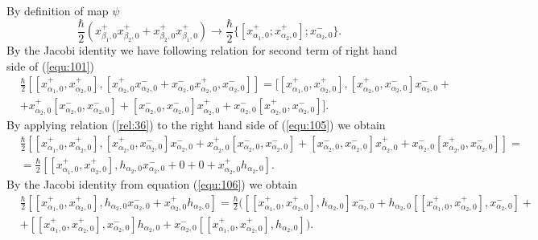 \documentclass[english]{elsarticle}
\numberwithin{equation}{section}
\begin{document}
By definition of map $\psi$
\begin{equation}
\label{midres:3}
\frac{\hbar}{2}\left(x_{\beta_{1},0}^{+}x_{\beta_{2},0}^{+}+x_{\beta_{2},0}^{+}x_{\beta_{1},0}^{+}\right) \rightarrow \frac{\hbar}{2}\{[x_{\alpha_{1},0}^{+};x_{\alpha_{2},0}^{+}];x_{\alpha_{2},0}^{-}\}.
\end{equation}
By the Jacobi identity we have following relation for second term of right hand side of (\ref{equ:101})
\begin{equation}
\label{equ:105}
\begin{split}
&\frac{\hbar}{2}[[x_{\alpha_{1},0}^{+},x_{\alpha_{2},0}^{+}],[x_{\alpha_{2},0}^{+}x_{\alpha_{2},0}^{-}+ x_{\alpha_{2},0}^{-}x_{\alpha_{2},0}^{+},x_{\alpha_{2},0}^{-}]]= [[x_{\alpha_{1},0}^{+},x_{\alpha_{2},0}^{+}],[x_{\alpha_{2},0}^{+},x_{\alpha_{2},0}^{-}]x_{\alpha_{2},0}^{-}+\\
&+x_{\alpha_{2},0}^{+}[x_{\alpha_{2},0}^{-},x_{\alpha_{2},0}^{-}]
+[x_{\alpha_{2},0}^{-},x_{\alpha_{2},0}^{-}]x_{\alpha_{2},0}^{+} + x_{\alpha_{2},0}^{-}[x_{\alpha_{2},0}^{+},x_{\alpha_{2},0}^{-}]].
\end{split}
\end{equation}
By applying relation (\ref{rel:36}) to the right hand side of (\ref{equ:105}) we obtain
\begin{equation}
\label{equ:106}
\begin{split}
&\frac{\hbar}{2}[[x_{\alpha_{1},0}^{+},x_{\alpha_{2},0}^{+}],[x_{\alpha_{2},0}^{+},x_{\alpha_{2},0}^{-}]x_{\alpha_{2},0}^{-}+ x_{\alpha_{2},0}^{+}[x_{\alpha_{2},0}^{-},x_{\alpha_{2},0}^{-}]
+ [x_{\alpha_{2},0}^{-},x_{\alpha_{2},0}^{-}]x_{\alpha_{2},0}^{+}+ x_{\alpha_{2},0}^{-}[x_{\alpha_{2},0}^{+},x_{\alpha_{2},0}^{-}]]=\\
& = \frac{\hbar}{2}[[x_{\alpha_{1},0}^{+},x_{\alpha_{2},0}^{+}],h_{\alpha_{2},0}x_{\alpha_2,0}^{-}+ 0+ 0+ x_{\alpha_2,0}^{+}h_{\alpha_{2},0}].
\end{split}
\end{equation}
By the Jacobi identity from equation (\ref{equ:106}) we obtain
\begin{equation}
\label{equ:107}
\begin{split}
&\frac{\hbar}{2}[[x_{\alpha_{1},0}^{+},x_{\alpha_{2},0}^{+}],h_{\alpha_{2},0}x_{\alpha_2,0}^{-}+ x_{\alpha_2,0}^{+}h_{\alpha_{2},0}] = \frac{\hbar}{2}([[x_{\alpha_{1},0}^{+},x_{\alpha_{2},0}^{+}],h_{\alpha_{2},0}]x_{\alpha_{2},0}^{-} + h_{\alpha_{2},0}[[x_{\alpha_{1},0}^{+},x_{\alpha_{2},0}^{+}],x_{\alpha_{2},0}^{-}]+\\
& + [[x_{\alpha_{1},0}^{+},x_{\alpha_{2},0}^{+}],x_{\alpha_{2},0}^{-}]h_{\alpha_{2},0} + x_{\alpha_{2},0}^{-}[[x_{\alpha_{1},0}^{+},x_{\alpha_{2},0}^{+}],h_{\alpha_{2},0}]).
\end{split}
\end{equation}
\end{document}
